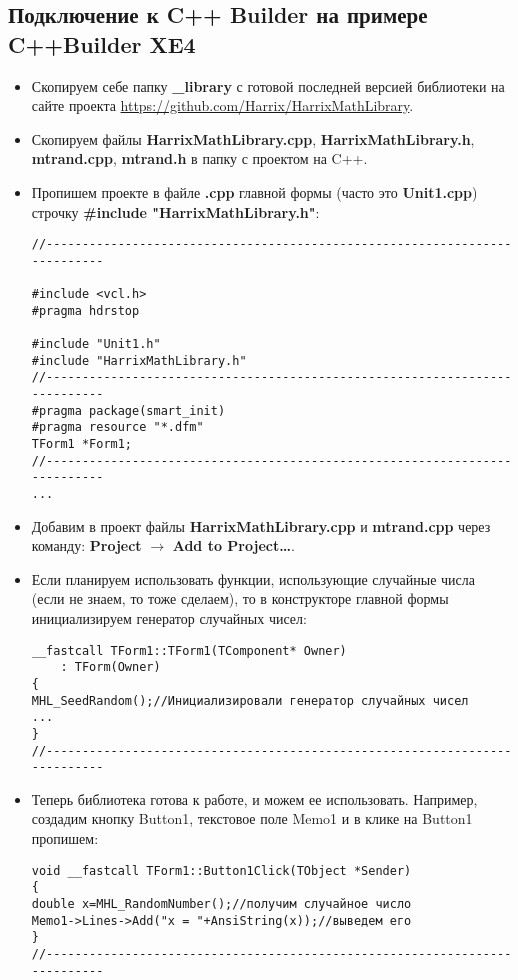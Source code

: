 \subsection{Подключение к C++ Builder на примере C++Builder XE4}
\begin{itemize}
\item Скопируем себе папку \textbf{\_library} с готовой последней версией библиотеки на сайте проекта \href{https://github.com/Harrix/HarrixMathLibrary}{https://github.com/Harrix/HarrixMathLibrary}.

\item Скопируем файлы \textbf{HarrixMathLibrary.cpp}, \textbf{HarrixMathLibrary.h}, \textbf{mtrand.cpp}, \textbf{mtrand.h} в папку с проектом на C++.

\item Пропишем проекте в файле \textbf{.cpp} главной формы (часто это \textbf{Unit1.cpp}) строчку \textbf{\#include "HarrixMathLibrary.h"}:
\begin{lstlisting}[label=install_code_04,caption=Подключение библиотеки]
//---------------------------------------------------------------------------

#include <vcl.h>
#pragma hdrstop

#include "Unit1.h"
#include "HarrixMathLibrary.h"
//---------------------------------------------------------------------------
#pragma package(smart_init)
#pragma resource "*.dfm"
TForm1 *Form1;
//---------------------------------------------------------------------------
...
\end{lstlisting}

\item Добавим в проект файлы \textbf{HarrixMathLibrary.cpp} и \textbf{mtrand.cpp} через команду: \textbf{Project} $\rightarrow$ \textbf{Add to Project\dots}.

\item Если планируем использовать функции, использующие случайные числа (если не знаем, то тоже сделаем), то в конструкторе главной формы инициализируем генератор случайных чисел:
\begin{lstlisting}[label=install_code_05,caption=Инициализация генератора случайных чисел]
__fastcall TForm1::TForm1(TComponent* Owner)
	: TForm(Owner)
{
MHL_SeedRandom();//Инициализировали генератор случайных чисел
...
}
//---------------------------------------------------------------------------
\end{lstlisting}

\item Теперь библиотека готова к работе, и можем ее использовать. Например, создадим кнопку Button1, текстовое поле Memo1 и в клике на Button1 пропишем:
\begin{lstlisting}[label=install_code_06,caption=Пример использования]
void __fastcall TForm1::Button1Click(TObject *Sender)
{
double x=MHL_RandomNumber();//получим случайное число
Memo1->Lines->Add("x = "+AnsiString(x));//выведем его
}
//---------------------------------------------------------------------------
\end{lstlisting}
\end{itemize}

